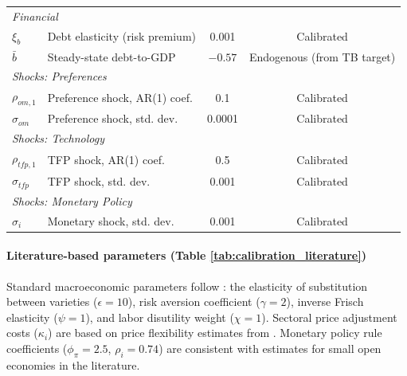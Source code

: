\begin{footnotesize}
\begin{longtable}{llcc}
\midrule
\multicolumn{4}{l}{\textit{Financial}} \\
$\xi_b$ & Debt elasticity (risk premium) & 0.001 & Calibrated \\
$\bar{b}$ & Steady-state debt-to-GDP & $-0.57$ & Endogenous (from TB target) \\
\midrule
\multicolumn{4}{l}{\textit{Shocks: Preferences}} \\
$\rho_{om,1}$ & Preference shock, AR(1) coef. & 0.1 & Calibrated \\
$\sigma_{om}$ & Preference shock, std. dev. & 0.0001 & Calibrated \\
\midrule
\multicolumn{4}{l}{\textit{Shocks: Technology}} \\
$\rho_{tfp,1}$ & TFP shock, AR(1) coef. & 0.5 & Calibrated \\
$\sigma_{tfp}$ & TFP shock, std. dev. & 0.001 & Calibrated \\
\midrule
\multicolumn{4}{l}{\textit{Shocks: Monetary Policy}} \\
$\sigma_i$ & Monetary shock, std. dev. & 0.001 & Calibrated \\
\end{longtable}

\end{footnotesize}


\paragraph{Literature-based parameters (Table \ref{tab:calibration_literature})} 
Standard macroeconomic parameters follow \citet{ferrante2023inflationary}: the elasticity of substitution between varieties ($\epsilon=10$), risk aversion coefficient ($\gamma=2$), inverse Frisch elasticity ($\psi=1$), and labor disutility weight ($\chi=1$). Sectoral price adjustment costs ($\kappa_i$) are based on price flexibility estimates from \citet{pasten2021sectoral}. Monetary policy rule coefficients ($\phi_\pi=2.5$, $\rho_i=0.74$) are consistent with estimates for small open economies in the literature.

